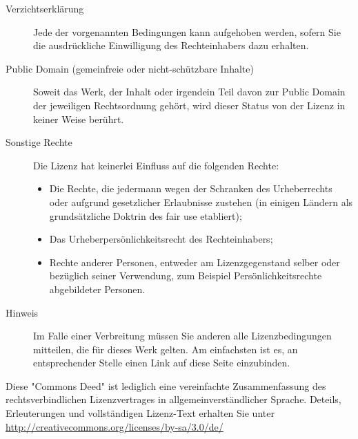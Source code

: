 \documentclass[a4paper,12pt,twoside]{book} %
\begin{document}
\begin{description}
    \item[Verzichtserklärung] Jede der vorgenannten Bedingungen kann aufgehoben werden, 
	  sofern Sie die ausdrückliche Einwilligung des Rechteinhabers dazu erhalten.
    \item[Public Domain (gemeinfreie oder nicht-schützbare Inhalte)] Soweit das Werk, 
	  der Inhalt oder irgendein Teil davon zur Public Domain der jeweiligen Rechtsordnung 
	  gehört, wird dieser Status von der Lizenz in keiner Weise berührt.
    \item[Sonstige Rechte] Die Lizenz hat keinerlei Einfluss auf die folgenden Rechte:
      \begin{itemize}
          \item Die Rechte, die jedermann wegen der Schranken des Urheberrechts oder 
		aufgrund gesetzlicher Erlaubnisse zustehen (in einigen Ländern als 
		grundsätzliche Doktrin des fair use etabliert);
          \item Das Urheberpersönlichkeitsrecht des Rechteinhabers;
          \item Rechte anderer Personen, entweder am Lizenzgegenstand selber oder bezüglich 
		seiner Verwendung, zum Beispiel Persönlichkeitsrechte abgebildeter Personen.
      \end{itemize}
    \item[Hinweis] Im Falle einer Verbreitung müssen Sie anderen alle Lizenzbedingungen 
	  mitteilen, die für dieses Werk gelten. Am einfachsten ist es, an entsprechender 
	  Stelle einen Link auf diese Seite einzubinden.

 \end{description}

Diese "Commons Deed" ist lediglich eine vereinfachte Zusammenfassung des rechtsverbindlichen 
Lizenzvertrages in allgemeinverständlicher Sprache. Deteils, Erleuterungen und vollständigen
Lizenz-Text erhalten Sie unter \url{http://creativecommons.org/licenses/by-sa/3.0/de/}

\newpage 



\mainmatter 


% 

































% 
 
\backmatter



\appendix
\cleardoublepage
\printindex
\end{document}
